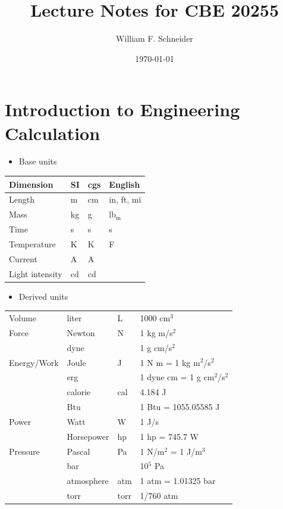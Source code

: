 \documentclass[11pt]{article}
\author{William F. Schneider}
\date{\today}
\title{Lecture Notes for CBE 20255}
\begin{document}
\begin{options}
\end{options}

\section{Introduction to Engineering Calculation}
\label{sec-1}
\begin{itemize}
\item Base units
\end{itemize}

\begin{center}
\begin{tabular}{llll}
\hline
Dimension & SI & cgs & English\\
\hline
Length & m & cm & in, ft, mi\\
Mass & kg & g & lb$_{\text{m}}$\\
Time & s & s & s\\
Temperature & K & K & F\\
Current & A & A & \\
Light intensity & cd & cd & \\
\hline
\end{tabular}
\end{center}

\begin{itemize}
\item Derived units
\end{itemize}
\begin{center}
\begin{tabular}{llll}
\hline
Volume & liter & L & 1000 cm$^{\text{3}}$\\
Force & Newton & N & 1 kg m/s$^{\text{2}}$\\
 & dyne &  & 1 g cm/s$^{\text{2}}$\\
Energy/Work & Joule & J & 1 N m = 1 kg m$^{\text{2}}$/s$^{\text{2}}$\\
 & erg &  & 1 dyne cm = 1 g cm$^{\text{2}}$/s$^{\text{2}}$\\
 & calorie & cal & 4.184 J\\
 & Btu &  & 1 Btu = 1055.05585 J\\
Power & Watt & W & 1 J/s\\
 & Horsepower & hp & 1 hp = 745.7 W\\
Pressure & Pascal & Pa & 1 N/m$^{\text{2}}$ = 1 J/m$^{\text{3}}$\\
 & bar &  & 10$^{\text{5}}$ Pa\\
 & atmosphere & atm & 1 atm = 1.01325 bar\\
 & torr & torr & 1/760 atm\\
\hline
\end{tabular}
\end{center}
\end{document}
